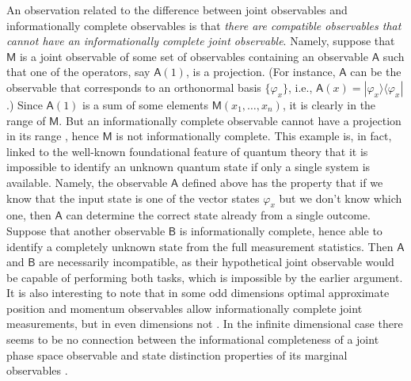 \documentclass[12pt]{article}
\theoremstyle{definition}
\newcommand{\kb}[2]{|#1\rangle\langle#2|} %
\newcommand{\Ao}{\mathsf{A}}%
\newcommand{\Bo}{\mathsf{B}}%
\newcommand{\Mo}{\mathsf{M}}%
\begin{document}
An observation related to the difference between joint observables and informationally complete observables is that \emph{there are compatible observables that cannot have an informationally complete joint observable}.
Namely, suppose that $\Mo$ is a joint observable of some set of observables containing an observable $\Ao$ such that one of the operators, say $\Ao(1)$, is a projection. (For instance, $\Ao$ can be the observable that corresponds to an orthonormal basis $\{\varphi_x\}$, i.e., $\Ao(x)=\kb{\varphi_x}{\varphi_x}$.)
Since $\Ao(1)$ is a sum of some elements $\Mo(x_1,\ldots,x_n)$, it is clearly in the range of $\Mo$.
But an informationally complete observable cannot have a projection in its range \cite{BuCaLa95}, hence $\Mo$ is not informationally complete.
This example is, in fact, linked to the well-known foundational feature of quantum theory that it is impossible to identify an unknown quantum state if only a single system is available.
Namely, the observable $\Ao$ defined above has the property that if we know that the input state is one of the vector states $\varphi_x$ but we don't know which one, then $\Ao$ can determine the correct state already from a single outcome. 
Suppose that another observable $\Bo$ is informationally complete, hence able to identify a completely unknown state from the full measurement statistics. 
Then $\Ao$ and $\Bo$ are necessarily incompatible, as their hypothetical joint observable would be capable of performing both tasks, which is impossible by the earlier argument. 
It is also interesting to note that in some odd dimensions optimal approximate position and momentum observables allow informationally complete joint measurements, but in even dimensions not \cite{CaHeTo12}. 
In the infinite dimensional case there seems to be no connection between the informational completeness of a joint phase space observable and state distinction properties of its marginal observables \cite{Schultz12}. 
\end{document}
